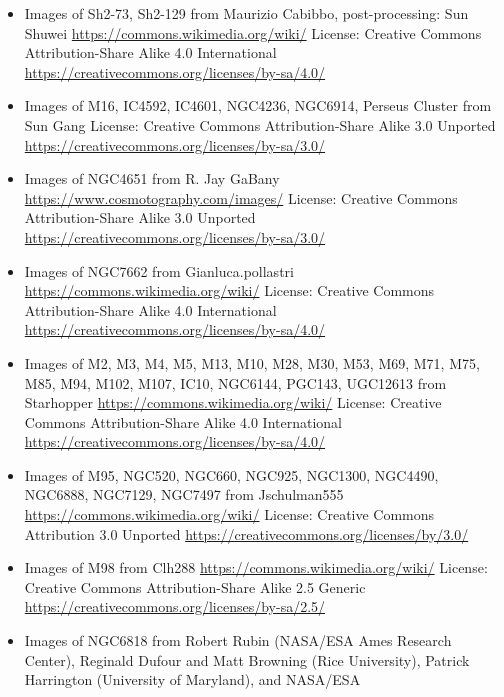 \begin{itemize}
	 No machine-readable source provided. Own work assumed (based on copyright claims).
	 No machine-readable author provided. Fany Toporenko assumed (based on copyright claims).
	 License: unresolved. The GNU Free Documentation License recorded here came from
	 the uploader of Wikimedia Commons File:Ngc247.jpg, which Commons deleted on
	 2020-07-28 as a Digitized Sky Survey plate composite; the plates stay
	 AURA/Caltech copyright, so the grant was not the uploader's to make.
\item Images of Sh2-73, Sh2-129
	 from Maurizio Cabibbo, post-processing: Sun Shuwei
	 \url{https://commons.wikimedia.org/wiki/}
	 License: Creative Commons Attribution-Share Alike 4.0 International \url{https://creativecommons.org/licenses/by-sa/4.0/}
\item Images of M16, IC4592, IC4601, NGC4236, NGC6914, Perseus Cluster
	 from Sun Gang
	 License: Creative Commons Attribution-Share Alike 3.0 Unported \url{https://creativecommons.org/licenses/by-sa/3.0/}
\item Images of NGC4651
	 from R. Jay GaBany
	 \url{https://www.cosmotography.com/images/}
	 License: Creative Commons Attribution-Share Alike 3.0 Unported \url{https://creativecommons.org/licenses/by-sa/3.0/}
\item Images of NGC7662
	 from Gianluca.pollastri
	 \url{https://commons.wikimedia.org/wiki/}
	 License: Creative Commons Attribution-Share Alike 4.0 International \url{https://creativecommons.org/licenses/by-sa/4.0/}
\item Images of M2, M3, M4, M5, M13, M10, M28, M30, M53, M69, M71, M75, M85, M94,
	 M102, M107, IC10, NGC6144, PGC143, UGC12613
	 from Starhopper
	 \url{https://commons.wikimedia.org/wiki/}
	 License: Creative Commons Attribution-Share Alike 4.0 International \url{https://creativecommons.org/licenses/by-sa/4.0/}
\item Images of M95, NGC520, NGC660, NGC925, NGC1300, NGC4490, NGC6888, NGC7129, NGC7497
	 from Jschulman555
	 \url{https://commons.wikimedia.org/wiki/}
	 License: Creative Commons Attribution 3.0 Unported \url{https://creativecommons.org/licenses/by/3.0/}
\item Images of M98
	 from Clh288
	 \url{https://commons.wikimedia.org/wiki/}
	 License: Creative Commons Attribution-Share Alike 2.5 Generic \url{https://creativecommons.org/licenses/by-sa/2.5/}
\item Images of NGC6818
	 from Robert Rubin (NASA/ESA Ames Research Center), Reginald Dufour and Matt Browning (Rice University), Patrick Harrington (University of Maryland), and NASA/ESA

\end{itemize}
